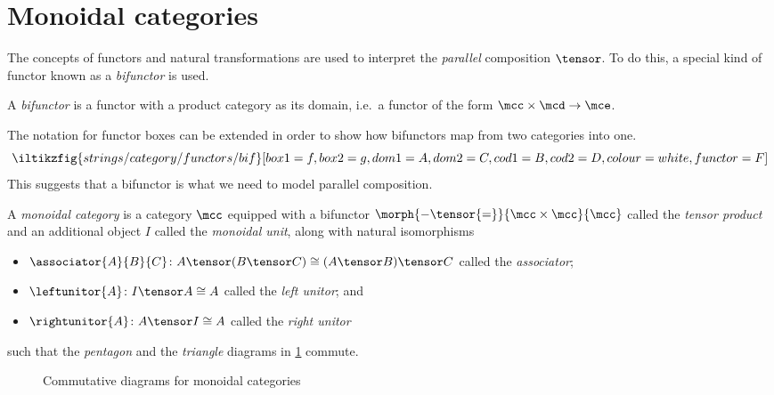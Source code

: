 \section{Monoidal categories}\label{sec:monoidal-categories}

The concepts of functors and natural transformations are used to interpret
the \emph{parallel} composition \(\tensor\).
To do this, a special kind of functor known as a \emph{bifunctor} is used.

\begin{definition}[Bifunctor]
    A \emph{bifunctor} is a functor with a product category as its domain, i.e.\
    a functor of the form \(\mcc \times \mcd \to \mce\).
\end{definition}

The notation for functor boxes can be extended in order to show how bifunctors
map from two categories into one.
\[
    \iltikzfig{strings/category/functors/bif}[box1=f,box2=g,dom1=A,dom2=C,cod1=B,cod2=D,colour=white,functor=F]
\]
This suggests that a bifunctor is what we need to model
parallel composition.

\begin{definition}
    \label{def:monoidal-category}
    A \emph{monoidal category} is a category \(\mcc\) equipped with a
    bifunctor \(\morph{{-} \tensor {=}}{\mcc \times \mcc}{\mcc}\) called the
    \emph{tensor product} and an additional object \(I\) called the
    \emph{monoidal unit},
    along with natural isomorphisms
    \begin{itemize}
        \item \(
              \associator{A}{B}{C}
              \colon
              A \tensor (B \tensor C)
              \cong
              (A \tensor B) \tensor C
              \) called the \emph{associator};
        \item \(
              \leftunitor{A}
              \colon
              I \tensor A
              \cong
              A
              \) called the \emph{left unitor}; and
        \item \(
              \rightunitor{A}
              \colon
              A \tensor I
              \cong
              A
              \) called the \emph{right unitor}
    \end{itemize}
    such that the \emph{pentagon} and the \emph{triangle} diagrams in
    \cref{fig:mc-diagrams} commute.
\end{definition}

\begin{figure}
    \centering
    

    \vspace{1em}

    
    \caption{Commutative diagrams for monoidal categories}
    \label{fig:mc-diagrams}
\end{figure}

